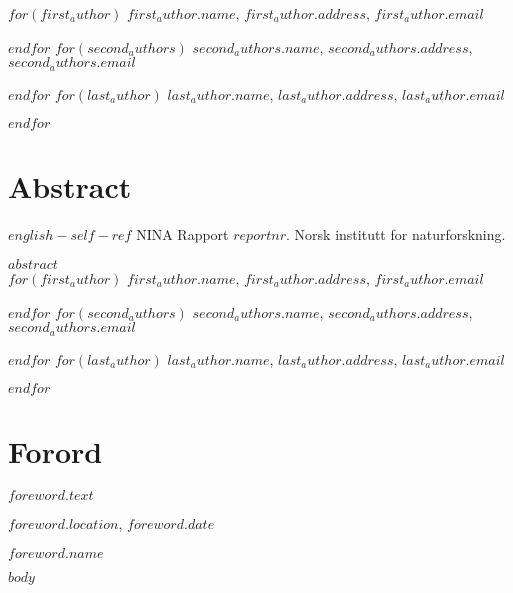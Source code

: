 \documentclass[11pt, a4paper]{article}
\begin{document}
\vspace{1cm}
\small
$for(first_author)$
$first_author.name$, $first_author.address$, $first_author.email$  \par
$endfor$
$for(second_authors)$
$second_authors.name$, $second_authors.address$, $second_authors.email$  \par
$endfor$
$for(last_author)$
$last_author.name$, $last_author.address$, $last_author.email$  \par
$endfor$
\normalsize
\clearpage

\setcounter{secnumdepth}{0}
\section{Abstract}


\footnotesize{$english-self-ref$} NINA Rapport $reportnr$. Norsk institutt for naturforskning. \par
\vspace{0.5cm}
\normalsize{
$abstract$} \\

\vspace{1cm}
\small
$for(first_author)$
$first_author.name$, $first_author.address$, $first_author.email$  \par
$endfor$
$for(second_authors)$
$second_authors.name$, $second_authors.address$, $second_authors.email$  \par
$endfor$
$for(last_author)$
$last_author.name$, $last_author.address$, $last_author.email$  \par
$endfor$
\normalsize
\clearpage


\doublespacing
\tableofcontents
{}
\singlespacing
\clearpage

\section{Forord}

\normalsize
$foreword.text$\par
\medskip
$foreword.location$, $foreword.date$\par
\medskip
$foreword.name$



\clearpage
\setcounter{secnumdepth}{4}
\setlength{\parskip}{6pt}

$body$


\end{document}
